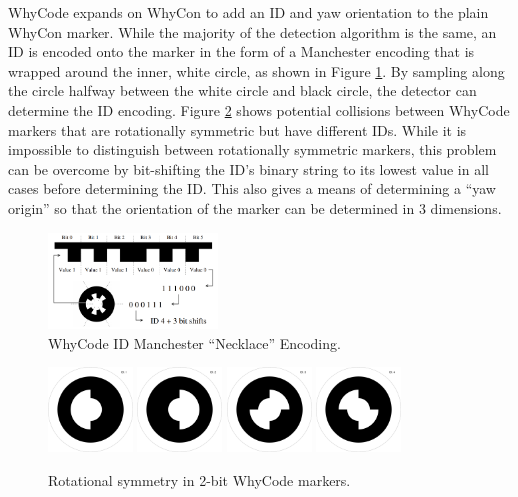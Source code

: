 WhyCode expands on WhyCon to add an ID and yaw orientation to the plain WhyCon marker.
While the majority of the detection algorithm is the same,
an ID is encoded onto the marker in the form of a Manchester encoding that is wrapped around the inner, white circle,
as shown in Figure \ref{fig:whycode_id}.
By sampling along the circle halfway between the white circle and black circle, the detector can determine the ID encoding.
Figure \ref{fig:rotationally_symmetric_whycode_markers} shows potential collisions between WhyCode markers that are
rotationally symmetric but have different IDs.
While it is impossible to distinguish between rotationally symmetric markers, this problem can be overcome by bit-shifting
the ID's binary string to its lowest value in all cases before determining the ID.
This also gives a means of determining a ``yaw origin'' so that the orientation of the marker can be determined in 3 dimensions.

\begin{figure}
    \centering
    \includegraphics[width=0.4\textwidth]{images/whycode_manchester_explanation.png}
    \caption{WhyCode ID Manchester ``Necklace'' Encoding.}
    \label{fig:whycode_id}
\end{figure}

\begin{figure}
    \centering
    \includegraphics[width=0.2\textwidth]{images/00000001.png}
    \includegraphics[width=0.2\textwidth]{images/00000002.png}
    \includegraphics[width=0.2\textwidth]{images/00000003.png}
    \includegraphics[width=0.2\textwidth]{images/00000004.png}
    \caption{Rotational symmetry in 2-bit WhyCode markers.}
    \label{fig:rotationally_symmetric_whycode_markers}
\end{figure}

